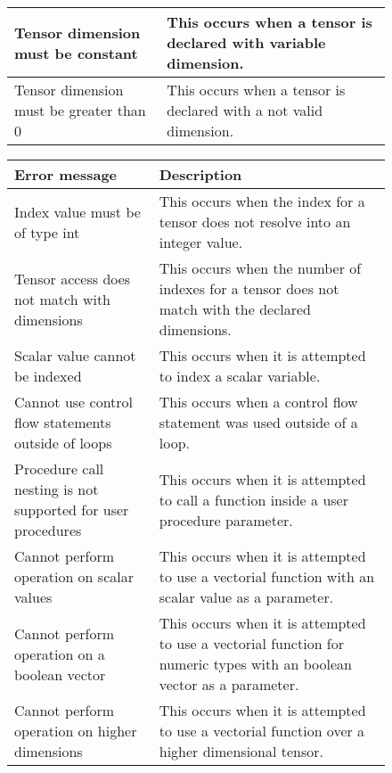 \begin{figure}[h]
\begin{tabular}{p{1.5in}p{2.5in}}
        \midrule Tensor dimension must be constant &
	This occurs when a tensor is declared with variable dimension.\\

        \midrule Tensor dimension must be greater than 0 &
	This occurs when a tensor is declared with a not valid dimension.\\

        \bottomrule
    \end{tabular}
\end{figure}

\newpage

\begin{figure}[h]
    \centering
    \begin{tabular}{p{1.5in}p{2.5in}}
        \toprule
        \textbf{Error message} & \textbf{Description}\\

        \midrule Index value must be of type int &
	This occurs when the index for a tensor does not resolve into an
	integer value.\\

        \midrule Tensor access does not match with dimensions &
	This occurs when the number of indexes for a tensor does not match
	with the declared dimensions.\\

        \midrule Scalar value cannot be indexed &
	This occurs when it is attempted to index a scalar variable.\\

        \midrule Cannot use control flow statements outside of loops &
	This occurs when a control flow statement was used outside of a loop.\\

        \midrule Procedure call nesting is not supported for user procedures &
        This occurs when it is attempted to call a function inside a user
        procedure parameter.\\

        \midrule Cannot perform \newline operation on scalar \newline values &
        This occurs when it is attempted to use a vectorial function with an
        scalar value as a parameter.\\

        \midrule Cannot perform \newline operation on a boolean vector &
        This occurs when it is attempted to use a vectorial function for numeric
        types with an boolean vector as a parameter.\\

        \midrule Cannot perform \newline operation on higher \newline dimensions &
        This occurs when it is attempted to use a vectorial function over a
        higher dimensional tensor.\\

        \bottomrule
    \end{tabular}
\end{figure}

